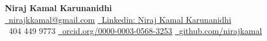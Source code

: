\documentclass[letterpaper,11pt]{article}
\begin{document}

\begin{center}
    {\huge \textbf{ Niraj Kamal Karunanidhi} }\\[5pt]
    \small
    \href{mailto:nirajkkamal@gmail.com}{\raisebox{-0.2\height}\faEnvelope\ \underline{nirajkkamal@gmail.com}} \hspace{1.5em}
    \href{https://linkedin.com/in/niraj-kamal-k-31687212a/}{\raisebox{-0.2\height}\faLinkedin\ \underline{Linkedin: Niraj Kamal Karunanidhi}} \\
    {\raisebox{-0.1\height}\faPhone\ 404 449 9773} \hspace{1.5em} 
    \href{https://orcid.org/0000-0003-0568-3253}{\raisebox{-0.2\height}\faOrcid\ \underline{orcid.org/0000-0003-0568-3253}} \hspace{1.5em}
    \href{https://github.com/nirajkamal}{\raisebox{-0.2\height}\faGithub\ \underline{github.com/nirajkamal}}
\end{center}




\vspace{-20 pt}
\end{document}
